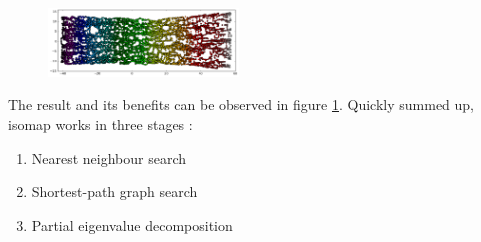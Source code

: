 \begin{figure}
	\centering
	\includegraphics[width=0.45\textwidth]{external_content/graphs/swiss_roll-manifold.png}
	\captionsetup{justification=centering}
	\label{fig:swissrollmanifold}
\end{figure}

\noindent
The result and its benefits can be observed in figure \ref{fig:swissrollmanifold}.
Quickly summed up, isomap works in three stages \cite{scikit-learn}:

\begin{enumerate}
	\vspace{-2mm}
	\item Nearest neighbour search
	\vspace{-2mm}
	\item Shortest-path graph search
	\vspace{-2mm}
	\item Partial eigenvalue decomposition
\end{enumerate}





